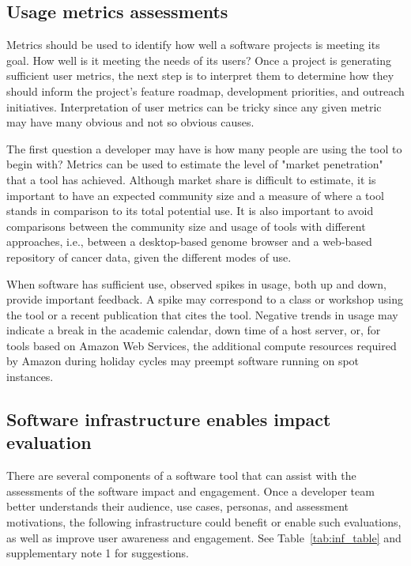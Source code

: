 \documentclass{article}
\begin{document}
 \subsection{Usage metrics assessments}
Metrics should be used to identify how well a software projects is meeting its goal. How well is it meeting the needs of its users? Once a project is generating sufficient user metrics, the next step is to interpret them to determine how they should inform the project's feature roadmap, development priorities, and outreach initiatives. Interpretation of user metrics can be tricky since any given metric may have many obvious and not so obvious causes. 

The first question a developer may have is how many people are using the tool to begin with? Metrics can be used to estimate the level of "market penetration" that a tool has achieved. Although market share is difficult to estimate, it is important to have an expected community size and a measure of where a tool stands in comparison to its total potential use. It is also important to avoid comparisons between the community size and usage of tools with different approaches, i.e., between a desktop-based genome browser and a web-based repository of cancer data, given the different modes of use. 

When software has sufficient use, observed spikes in usage, both up and down, provide important feedback. A spike may correspond to a class or workshop using the tool or a recent publication that cites the tool. Negative trends in usage may indicate a break in the academic calendar, down time of a host server, or, for tools based on Amazon Web Services, the additional compute resources required by Amazon during holiday cycles may preempt software running on spot instances.


\subsection{Software infrastructure enables impact evaluation}
There are several components of a software tool that can assist with the assessments of the software impact and engagement. Once a developer team better understands their audience, use cases, personas, and assessment motivations, the following infrastructure could benefit or enable such evaluations, as well as improve user awareness and engagement. 
See Table~\ref{tab:inf_table} and supplementary note 1 for suggestions.
\end{document}
